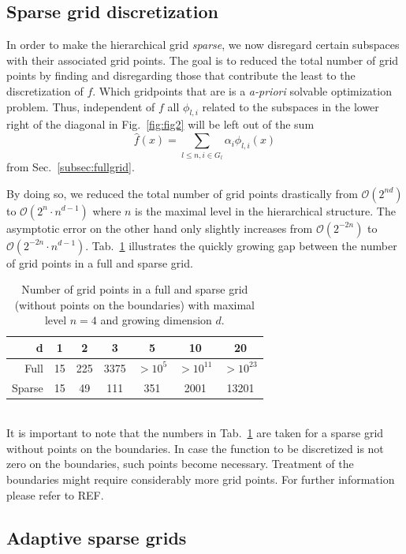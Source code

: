 \subsection{Sparse grid discretization}
In order to make the hierarchical grid \emph{sparse}, we now disregard certain
subspaces with their associated  grid points. The goal is to reduced the total
number of grid points by finding and disregarding those that contribute the
least to the discretization of $f$.
Which gridpoints that are is a \emph{a-priori}
solvable optimization problem. Thus, independent of $f$ all $\phi_{l,i}$
related to the subspaces in the
lower right of the diagonal in Fig.~\ref{fig:fig2} will be left out of the sum
$$\hat{f}(x) =  \sum_{l \leq n, i \in G_l}{\alpha_i\phi_{l,i}(x)}$$
from Sec.~\ref{subsec:fullgrid}.
\par
By doing so, we reduced the total number of grid points drastically
from $\mathcal{O}(2^{nd})$ to $\mathcal{O}(2^{n} \cdot n^{d-1})$ where $n$ is
the maximal level in the hierarchical structure. The asymptotic error on the
other hand only slightly increases from $\mathcal{O}(2^{-2n})$ to
\mbox{$\mathcal{O}(2^{-2n} \cdot n^{d-1})$}. Tab.~\ref{tab:tab1}
illustrates the quickly
growing gap between the number of grid points in a full and sparse grid.
\begin{table}[h]
  \centering
  \begin{tabular}{r | c | c | c | c | c | c}
    d & 1 & 2 & 3 & 5 & 10 & 20 \\
    \hline\hline
    Full & 15 &  225 & 3375 & $>10^5$ & $> 10^{11}$ & $> 10^{23}$ \\
    \hline
    Sparse & 15 & 49 & 111 & 351 & 2001 & 13201 \\
  \end{tabular}
  \captionsetup{width=0.44\textwidth}
  \caption{Number of grid points in a full and sparse grid
    (without points on the boundaries)
    with maximal level $n = 4$ and growing dimension $d$.\label{tab:tab1}}
\end{table}\\
It is important to note that the numbers in Tab.~\ref{tab:tab1} are taken
for a sparse grid without points on the boundaries. In case the function
to be discretized is not zero on the boundaries, such points become necessary.
Treatment of the boundaries might require considerably
more grid points. For further information please refer to REF.

\subsection{Adaptive sparse grids}


